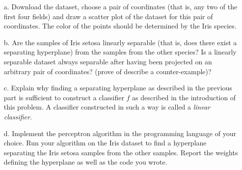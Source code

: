 \documentclass[11pt]{article}
\begin{document}
\begin{itemize}
    \item[a.] Download the dataset, choose a pair of coordinates (that is, any
        two of the first four fields) and draw a scatter plot of the dataset
        for this pair of coordinates. The color of the points should be
        determined by the Iris species.
    \item[b.] Are the samples of Iris setosa linearly separable (that is, does
        there exist a separating hyperplane) from the samples from the other
        species? Is a linearly separable dataset always separable after having
        been projected on an arbitrary pair of coordinates? (prove of describe
        a counter-example)?
    \item[c.] Explain why finding a separating hyperplane as described in the
        previous part is sufficient to construct a classifier $f$ as
        described in the introduction of this problem. A classifier constructed
        in such a way is called a \emph{linear classifier}.
    \item[d.] Implement the perceptron algorithm in the programming language of
        your choice. Run your algorithm on the Iris dataset to find
        a hyperplane separating the Iris setosa samples from the other samples.
        Report the weights defining the hyperplane as well as the code you
        wrote.
\end{itemize}
\end{document}
